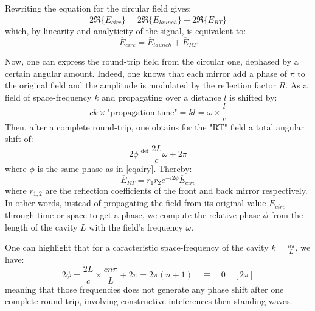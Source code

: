 \documentclass[10pt]{report}
\begin{document}
Rewriting the equation for the circular field gives:
\begin{equation}
2\Re\{\overline{E}_{circ}\} = 2\Re\{\overline{E}_{launch}\} + 2\Re\{\overline{E}_{RT}\}
\end{equation}
which, by linearity and analyticity of the signal, is equivalent to:
\begin{equation}
\label{eqecirc}
\overline{E}_{circ} = \overline{E}_{launch} + \overline{E}_{RT}
\end{equation}

Now, one can express the round-trip field from the circular one, dephased by a certain angular amount. Indeed, one knows that each mirror add a phase of $\pi$ to the original field and the amplitude is modulated by the reflection factor $R$. As a field of space-frequency $k$ and propagating over a distance $l$ is shifted by:
\begin{equation}
ck \times \textrm{"propagation time"} = kl = \omega \times \frac{l}{c}
\end{equation} 
Then, after a complete round-trip, one obtains for the "RT" field a total angular shift of:
\begin{equation}
2\phi \stackrel{\text{def}}{=} \frac{2L}{c}\omega + 2\pi
\end{equation} 
where $\phi$ is the same phase as in \eqref{eqairy}. Thereby:
\begin{equation}
\label{eqrt}
\overline{E}_{RT} = r_1 r_2 e^{-i2\phi} \overline{E}_{circ}
\end{equation}
where $r_{1,2}$ are the reflection coefficients of the front and back mirror respectively. In other words, instead of propagating the field from its original value $ \overline{E}_{circ}$ through time or space to get a phase, we compute the relative phase $\phi$ from the length of the cavity $L$ with the field's frequency $\omega$.

One can highlight that for a caracteristic space-frequency of the cavity $k=\frac{n\pi}{L}$, we have:
\begin{equation}
\label{phimodif}
2\phi = \frac{2L}{c} \times \frac{cn\pi}{L} + 2\pi = 2\pi(n + 1) \quad \equiv \quad 0 \quad [2\pi]
\end{equation}
meaning that those frequencies does not generate any phase shift after one complete round-trip, involving constructive inteferences then standing waves.
\end{document}
